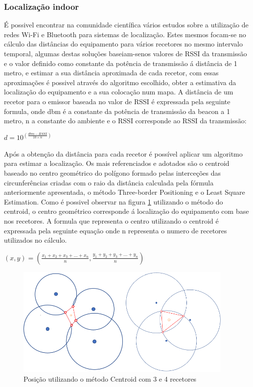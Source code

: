 \subsubsection{Localização indoor}
\par
É possivel encontrar na comunidade científica vários estudos sobre a utilização de redes Wi-Fi e Bluetooth para sistemas de localização. Estes mesmos focam-se no cálculo das distâncias do equipamento para vários recetores no mesmo intervalo temporal, algumas destas soluções baseiam-senos valores de RSSI da transmissão e o valor definido como constante da potência de transmissão á distância de 1 metro, e estimar a sua distância aproximada de cada recetor, com essas aproximações é possivel através do algoritmo escolhido\cite{Wang2013}, obter a estimativa da localização do equipamento e a sua colocação num mapa.
A distância de um recetor para o emissor baseada no  valor de RSSI é expressada pela seguinte formula, onde dbm é a constante da potência de transmissão da beacon a 1 metro, n a constante do ambiente e o RSSI corresponde ao RSSI da transmissão:
\par
\begin{center}
  $d=10^(\frac{dbm-RSSI}{10 \times n})$
\end{center}

\par
Após a obtenção da distância para cada recetor é possível  aplicar um algoritmo para estimar a localização. Os mais referenciados e adotados são o centroid baseado no centro geométrico do polígono formado pelas interceções das circunferências criadas com o raio da distância calculada pela fórmula anteriormente apresentada, o método Three-border Positioning e o Least Square Estimation.
Como é possivel observar na figura \ref{centroid} utilizando o método do centroid, o centro geométrico corresponde á localização do equipamento com base nos recetores. A formula que representa o centro utilizando o centroid é expressada pela seguinte equação onde n representa o numero de recetores utilizados no cálculo.
\par
\begin{center}
$ (x,y)= (\frac{x_{1}+x_{2}+x_{3}+...+x_{n}}{n},\frac{y_{1}+y_{2}+y_{3}+...+y_{n}}{n})$
\end{center}

\begin{figure}[htb]
\centering
\includegraphics[width=0.95\textwidth]{images/centroid3.png}
\caption{Posição utilizando o método Centroid com 3 e 4 recetores}\label{centroid}
\end{figure}

